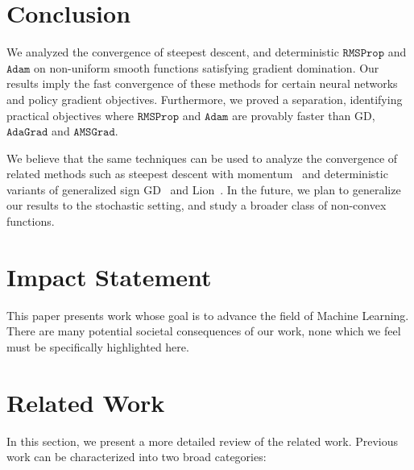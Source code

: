 \documentclass{article}
\newcommand{\RMS}{\texttt{RMSProp}}
\newcommand{\Adam}{\texttt{Adam}}
\newcommand{\AdaGrad}{\texttt{AdaGrad}}
\newcommand{\AMSGrad}{\texttt{AMSGrad}}
\begin{document}
\section{Conclusion}
\label{sec:conclusion}
We analyzed the convergence of steepest descent, and deterministic $\RMS$ and $\Adam$ on non-uniform smooth functions satisfying gradient domination. Our results imply the fast convergence of these methods for certain neural networks and policy gradient objectives. Furthermore, we proved a separation, identifying practical objectives where $\RMS$ and $\Adam$ are provably faster than GD, $\AdaGrad$ and $\AMSGrad$. 

We believe that the same techniques can be used to analyze the convergence of related methods such as steepest descent with momentum~\citep{bernstein2018signsgd} and deterministic variants of generalized sign GD~\citep{crawshaw2022robustness} and Lion~\citep{chen2023symbolic}. In the future, we plan to generalize our results to the stochastic setting, and study a broader class of non-convex functions. 
\section*{Impact Statement}
This paper presents work whose goal is to advance the field of Machine
Learning. There are many potential societal consequences of our work, none
which we feel must be specifically highlighted here.





\appendix
\onecolumn
\renewcommand{\contentsname}{Appendix}
{
  \hypersetup{hidelinks}
  \tableofcontents
}
\clearpage
\section{Related Work}
\label{app:related}
In this section, we present a more detailed review of the related work. Previous work can be characterized into two broad categories:
\end{document}
